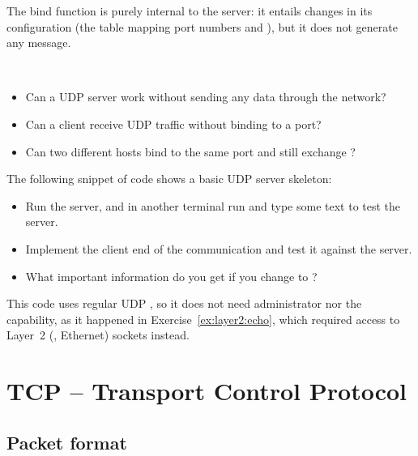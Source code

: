 The bind function is purely internal to the server: it entails changes in its configuration
(the table mapping port numbers and ), but it does not generate any message. 

\begin{exercise}\ \\[-0.5cm]
\begin{itemize}
\item Can a UDP server work without sending any data through the network?
\item Can a client receive UDP traffic without binding to a port?
\item Can two different hosts bind to the same port and still exchange ?
\end{itemize}
\end{exercise}


\begin{exercise}
The following snippet of code shows a basic UDP server skeleton:

\begin{center}
\end{center}

\begin{itemize}
\item Run the server, and in another terminal run  and type some text to test 
  the server.
\item Implement the client end of the communication and test it against the server.
\item What important information do you get if you change  to ?
\end{itemize}

\begin{remark}
This code uses regular UDP , so it does not need administrator 
nor the  capability, as it happened in Exercise~\ref{ex:layer2:echo},
which required access to Layer~2 (\eg, Ethernet) sockets instead.
\end{remark}
\end{exercise}

\section{TCP -- Transport Control Protocol}\label{sec:layer4:tcp}
\subsection{Packet format}

